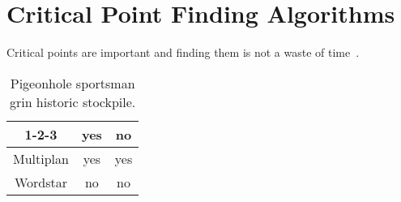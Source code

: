 \documentclass[../../main.tex]{subfiles}
\begin{document}
\chapter{Critical Point Finding Algorithms}

Critical points are important and finding them is not a waste of time~\cite{pennington2017}.

\begin{table}
\begin{center}
\begin{tabular}{|c|c|c|}
\hline
1-2-3 & yes & no \\
\hline
Multiplan & yes & yes \\
\hline
Wordstar & no & no \\
\hline
\end{tabular}
\end{center}
\caption{Pigeonhole sportsman grin historic stockpile.}
\end{table}

\onlyinsubfile{\printbibliography}
\end{document}
